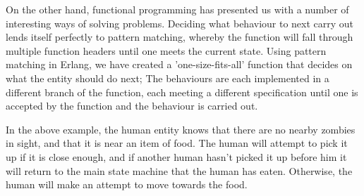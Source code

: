 On the other hand, functional programming has presented us with a number of interesting ways of solving problems. Deciding what behaviour to next carry out lends itself perfectly to pattern matching, whereby the function will fall through multiple function headers until one meets the current state. Using pattern matching in Erlang, we have created a 'one-size-fits-all' function that decides on what the entity should do next; The behaviours are each implemented in a different branch of the function, each meeting a different specification until one is accepted by the function and the behaviour is carried out.

In the above example, the human entity knows that there are no nearby zombies in sight, and that it is near an item of food. The human will attempt to pick it up if it is close enough, and if another human hasn't picked it up before him it will return to the main state machine that the human has eaten. Otherwise, the human will make an attempt to move towards the food.

\clearpage
\endinput
